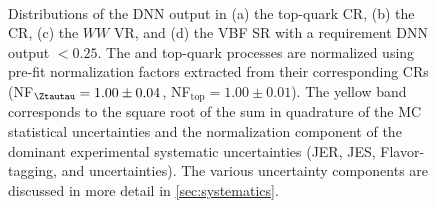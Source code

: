 \begin{figure}[ht]
{    }  \\
    {\caption{Distributions of the DNN output in (a) the top-quark CR, (b) the \Ztautau CR, (c) the $WW$ VR, and (d) the VBF SR with a requirement DNN output $<0.25$. The \Ztautau and top-quark processes are normalized using pre-fit normalization factors extracted from their corresponding CRs (NF$_{\Ztautau} = 1.00 \pm 0.04$, NF$_{\text{top}} = 1.00 \pm 0.01$). The yellow band corresponds to the square root of the sum in quadrature of the MC statistical uncertainties and the normalization component of the dominant experimental systematic uncertainties (JER, JES, Flavor-tagging, and \MET uncertainties). The various uncertainty components are discussed in more detail in \cref{sec:systematics}.
            \label{fig:dnn:dnn-val-in-crs} }}
\end{figure}
